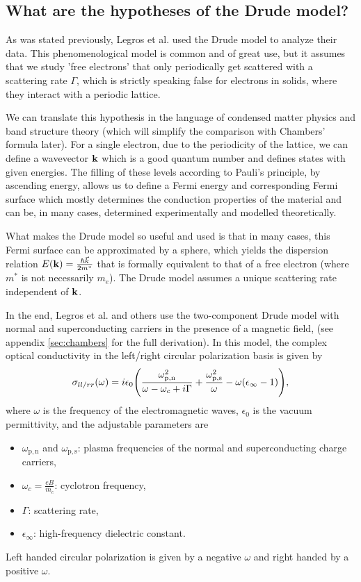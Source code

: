 \subsection{What are the hypotheses of the Drude model?}
As was stated previously, Legros et al.\cite{legros2022} used the Drude model to analyze their data. 
This phenomenological model is common and of great use, but it assumes that we study 'free electrons' that only periodically get scattered with a scattering rate $\Gamma$, 
which is strictly speaking false for electrons in solids, 
where they interact with a periodic lattice.

We can translate this hypothesis in the language of condensed matter physics and band structure theory (which will simplify the comparison with Chambers' formula later). 
For a single electron, due to the periodicity of the lattice, 
we can define a wavevector $\vb{k}$ which is a good quantum number and defines states with given energies. 
The filling of these levels according to Pauli's principle, by ascending energy, 
allows us to define a Fermi energy and corresponding Fermi surface 
which mostly determines the conduction properties of the material and can be, 
in many cases, determined experimentally and modelled theoretically.

What makes the Drude model so useful and used is that in many cases, 
this Fermi surface can be approximated by a sphere, which yields the dispersion relation
$E(\vb{k}) = \frac{\hbar\vec{k}}{2m^*}$  that is formally equivalent to that of a free electron
(where $m^*$ is not necessarily $m_e$). The Drude model assumes a unique scattering rate
independent of $\vb{k}$.

In the end, Legros et al.\cite{legros2022} and others\cite{post2021} use the two-component Drude model with normal and superconducting carriers in the presence of a magnetic field, (see appendix \ref{sec:chambers} for the full derivation).
In this model, the complex optical conductivity in the left/right circular polarization basis is given by
\begin{equation}
    \sigma_{ll/rr}(\omega) = i\epsilon_0\qty(
        \frac{\omega^2_{\mathrm{p,n}}}{\omega-\omega_c+i\Gamma}
        + \frac{\omega^2_{\mathrm{p,s}}}{\omega} - \omega(\epsilon_{\infty} - 1)),
\end{equation}
where $\omega$ is the frequency of the electromagnetic waves, $\epsilon_0$ is the vacuum
permittivity, and the adjustable parameters are
\begin{itemize}
    \item $\omega_{\mathrm{p,n}}$ and $\omega_{\mathrm{p,s}}$: plasma frequencies of the normal and
        superconducting charge carriers,
    \item $\omega_c = \frac{eB}{m_c}$: cyclotron frequency,
    \item $\Gamma$: scattering rate,
    \item $\epsilon_{\infty}$: high-frequency dielectric constant.
\end{itemize}
Left handed circular polarization is given by a negative $\omega$ and right handed by a positive $\omega$.

